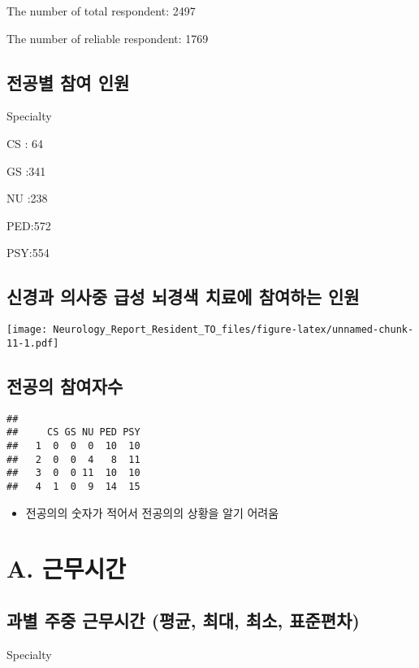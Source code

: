 \documentclass[]{book}
\providecommand{\tightlist}{%
  \setlength{\itemsep}{0pt}\setlength{\parskip}{0pt}}
\begin{document}
The number of total respondent: 2497

The number of reliable respondent: 1769

\hypertarget{section-13}{%
\subsection{전공별 참여 인원}\label{section-13}}

Specialty

CS : 64

GS :341

NU :238

PED:572

PSY:554

\hypertarget{section-14}{%
\subsection{신경과 의사중 급성 뇌경색 치료에 참여하는 인원}\label{section-14}}

\texttt{[image: Neurology\_Report\_Resident\_TO\_files/figure-latex/unnamed-chunk-11-1.pdf]}

\hypertarget{section-15}{%
\subsection{전공의 참여자수}\label{section-15}}

\begin{verbatim}
##    
##     CS GS NU PED PSY
##   1  0  0  0  10  10
##   2  0  0  4   8  11
##   3  0  0 11  10  10
##   4  1  0  9  14  15
\end{verbatim}

\begin{itemize}
\tightlist
\item
  전공의의 숫자가 적어서 전공의의 상황을 알기 어려움
\end{itemize}

\hypertarget{a.-}{%
\section{A. 근무시간}\label{a.-}}

\hypertarget{section-16}{%
\subsection{과별 주중 근무시간 (평균, 최대, 최소, 표준편차)}\label{section-16}}

Specialty
\end{document}
